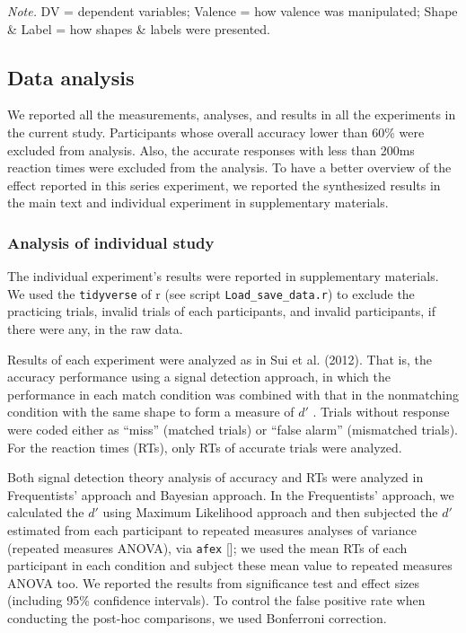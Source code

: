 \documentclass[
  english,
  man]{apa6}
\begin{document}
\begin{table}[tbp]
\begin{center}
\begin{threeparttable}
\begin{tablenotes}[para]
\normalsize{\textit{Note.} DV = dependent variables; Valence = how valence was manipulated; Shape \& Label = how shapes \& labels were presented.}
\end{tablenotes}

\end{threeparttable}
\end{center}

\end{table}

\hypertarget{data-analysis}{%
\subsection{Data analysis}\label{data-analysis}}

We reported all the measurements, analyses, and results in all the experiments in the current study. Participants whose overall accuracy lower than 60\% were excluded from analysis. Also, the accurate responses with less than 200ms reaction times were excluded from the analysis. To have a better overview of the effect reported in this series experiment, we reported the synthesized results in the main text and individual experiment in supplementary materials.

\hypertarget{analysis-of-individual-study}{%
\subsubsection{Analysis of individual study}\label{analysis-of-individual-study}}

The individual experiment's results were reported in supplementary materials. We used the \texttt{tidyverse} of r (see script \texttt{Load\_save\_data.r}) to exclude the practicing trials, invalid trials of each participants, and invalid participants, if there were any, in the raw data.

Results of each experiment were analyzed as in Sui et al. (2012). That is, the accuracy performance using a signal detection approach, in which the performance in each match condition was combined with that in the nonmatching condition with the same shape to form a measure of \(d'\) . Trials without response were coded either as \enquote{miss} (matched trials) or \enquote{false alarm} (mismatched trials). For the reaction times (RTs), only RTs of accurate trials were analyzed.

Both signal detection theory analysis of accuracy and RTs were analyzed in Frequentists' approach and Bayesian approach. In the Frequentists' approach, we calculated the \(d'\) using Maximum Likelihood approach and then subjected the \(d'\) estimated from each participant to repeated measures analyses of variance (repeated measures ANOVA), via \texttt{afex} {[}{]}; we used the mean RTs of each participant in each condition and subject these mean value to repeated measures ANOVA too. We reported the results from significance test and effect sizes (including 95\% confidence intervals). To control the false positive rate when conducting the post-hoc comparisons, we used Bonferroni correction.
\end{document}
